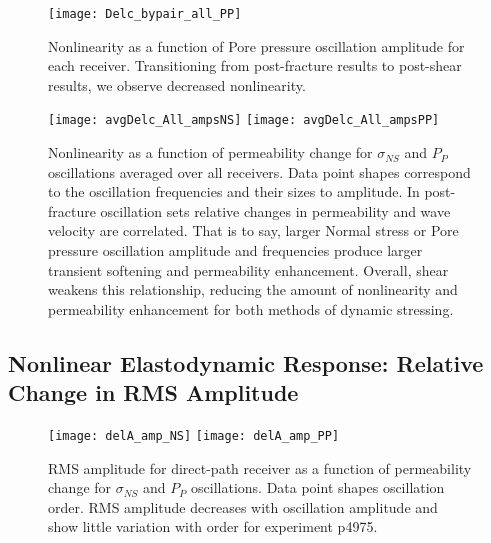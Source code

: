 \clearpage

\begin{figure}[ht]
	\centering
	\texttt{[image: Delc\_bypair\_all\_PP]}
	\caption{Nonlinearity as a function of Pore pressure oscillation amplitude for each receiver. Transitioning from post-fracture results to post-shear results, we observe decreased nonlinearity.}
		\label{fig:delc_plots_pp}
\end{figure}

\clearpage


\begin{figure}[ht]
	\centering
	\texttt{[image: avgDelc\_All\_ampsNS]}
	\texttt{[image: avgDelc\_All\_ampsPP]}
	\caption{Nonlinearity as a function of permeability change for $ \sigma_{NS} $ and $ P_P $ oscillations averaged over all receivers. Data point shapes correspond to the oscillation frequencies and their sizes to amplitude. In post-fracture oscillation sets relative changes in permeability and wave velocity are correlated. That is to say, larger Normal stress or Pore pressure oscillation amplitude and frequencies produce larger transient softening and permeability enhancement. Overall, shear weakens this relationship, reducing the amount of nonlinearity and permeability enhancement for both methods of dynamic stressing. }
	\label{fig:delc_plots2}
\end{figure}

\clearpage


\subsection{Nonlinear Elastodynamic Response: Relative Change in RMS Amplitude}



\begin{figure}[ht]
	\centering
	\texttt{[image: delA\_amp\_NS]}
	\texttt{[image: delA\_amp\_PP]}
	\caption{RMS amplitude for direct-path receiver as a function of permeability change for $ \sigma_{NS} $ and $ P_P $ oscillations. Data point shapes oscillation order.  RMS amplitude decreases with oscillation amplitude and show little variation with order for experiment p4975. }
	\label{fig:delA_ns_amp}
\end{figure}

